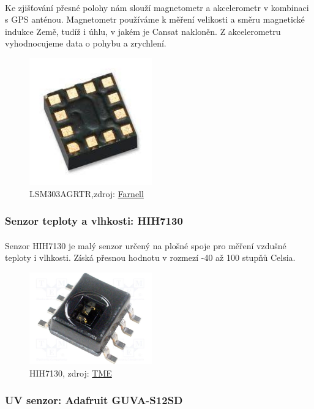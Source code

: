 \documentclass[a4paper]{report}
\begin{document}
\paragraph{} Ke zjišťování přesné polohy nám slouží magnetometr a akcelerometr v kombinaci s GPS anténou. Magnetometr používáme k měření velikosti a směru magnetické indukce Země, tudíž i úhlu, v jakém je Cansat nakloněn. Z akcelerometru vyhodnocujeme data o pohybu a zrychlení.
\begin{figure}[H]
\caption{LSM303AGRTR,zdroj: 
\href{http://uk.farnell.com/stmicroelectronics/lsm303agrtr/mems-3d-accelero-magneto-lga-12/dp/2664523RL}{Farnell}}
\centering
\includegraphics[width=150pt]{acc+mgn.jpg}
\end{figure}
\subsubsection{Senzor teploty a vlhkosti: HIH7130}
\paragraph{} Senzor HIH7130 je malý senzor určený na plošné spoje pro měření vzdušné teploty i vlhkosti. Získá přesnou hodnotu v rozmezí -40 až 100 stupňů Celsia.
\begin{figure}[H]
\caption{HIH7130, zdroj: 
\href{https://www.tme.eu/cz/details/hih7130-000-001/cidla-vlhkosti/honeywell/}{TME}}
\centering
\includegraphics[width=150pt]{HIH7130.jpg}
\end{figure}
\subsubsection{UV senzor: Adafruit GUVA-S12SD}
\end{document}

